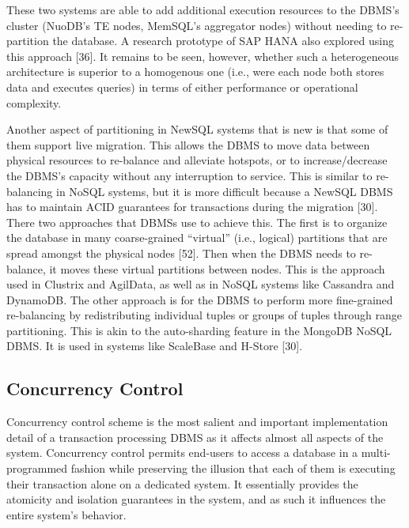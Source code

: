 \documentclass[a4paper,12pt,notitlepage,twoside,openright]{article}
\begin{document}
These two systems are able to add additional execution resources to the
DBMS's cluster (NuoDB's TE nodes, MemSQL's aggregator nodes) without
needing to re-partition the database. A research prototype of SAP HANA
also explored using this approach {[}36{]}. It remains to be seen,
however, whether such a heterogeneous architecture is superior to a
homogenous one (i.e., were each node both stores data and executes
queries) in terms of either performance or operational complexity.

Another aspect of partitioning in NewSQL systems that is new is that
some of them support live migration. This allows the DBMS to move data
between physical resources to re-balance and alleviate hotspots, or to
increase/decrease the DBMS's capacity without any interruption to
service. This is similar to re-balancing in NoSQL systems, but it is
more difficult because a NewSQL DBMS has to maintain ACID guarantees for
transactions during the migration {[}30{]}. There two approaches that
DBMSs use to achieve this. The first is to organize the database in many
coarse-grained ``virtual'' (i.e., logical) partitions that are spread
amongst the physical nodes {[}52{]}. Then when the DBMS needs to
re-balance, it moves these virtual partitions between nodes. This is the
approach used in Clustrix and AgilData, as well as in NoSQL systems like
Cassandra and DynamoDB. The other approach is for the DBMS to perform
more fine-grained re-balancing by redistributing individual tuples or
groups of tuples through range partitioning. This is akin to the
auto-sharding feature in the MongoDB NoSQL DBMS. It is used in systems
like ScaleBase and H-Store {[}30{]}.

\hypertarget{concurrency-control}{%
\subsection{Concurrency Control}\label{concurrency-control}}

Concurrency control scheme is the most salient and important
implementation detail of a transaction processing DBMS as it affects
almost all aspects of the system. Concurrency control permits end-users
to access a database in a multi-programmed fashion while preserving the
illusion that each of them is executing their transaction alone on a
dedicated system. It essentially provides the atomicity and isolation
guarantees in the system, and as such it influences the entire system's
behavior.
\end{document}
